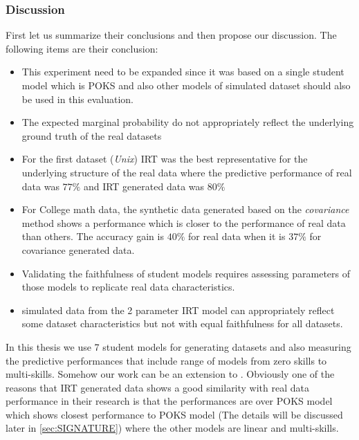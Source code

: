 \subsubsection{Discussion}

First let us summarize their conclusions and then propose our discussion. The following items are their conclusion:
\begin{itemize}
\item This experiment need to be expanded since it was based on a single student model which is POKS and also other models of simulated dataset should also be used in this evaluation.
\item The expected marginal probability do not appropriately reflect the underlying ground truth of the real datasets
\item For the first dataset (\textit{Unix}) IRT was the best representative for the underlying structure of the real data where the predictive performance of real data was $77\%$ and IRT generated data was $80\%$
\item For College math data, the synthetic data generated based on the \textit{covariance} method shows a performance which is closer to the performance of real data than others. The accuracy gain is $40\%$ for real data when it is $37\%$ for covariance generated data.

\item Validating the faithfulness of student models requires assessing parameters of those models to replicate real data characteristics.

\item simulated data from the 2 parameter IRT model can appropriately reflect some dataset characteristics but not with equal faithfulness for all datasets.
 
\end{itemize}

In this thesis we use 7 student models for generating datasets and also measuring the predictive performances that include range of models from zero skills to multi-skills. Somehow our work can be an extension to \citep{Desmarais2010}. Obviously one of the reasons that  IRT generated data shows a good similarity with real data performance in their research is that the performances are over POKS model which shows closest performance to POKS model (The details will be discussed later in \ref{sec:SIGNATURE}) where the other models are linear and multi-skills. 


